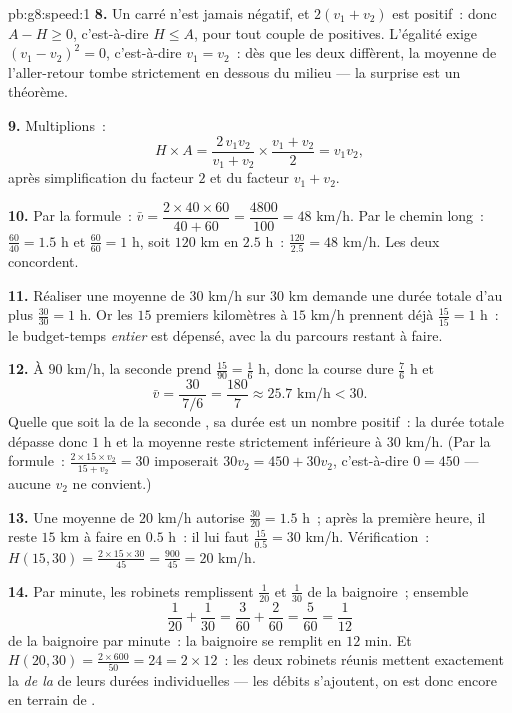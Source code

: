 \begin{solution}{pb:g8:speed:1}
\textbf{8.} Un carré n'est jamais négatif, et $2(v_1 + v_2)$ est
positif~: donc $A - H \geq 0$, c'est-à-dire $H \leq A$, pour tout
couple de  positives. L'égalité exige
$(v_1 - v_2)^2 = 0$, c'est-à-dire $v_1 = v_2$~: dès que les deux
 diffèrent, la moyenne de l'aller-retour tombe strictement
en dessous du milieu --- la surprise est un théorème.

\textbf{9.} Multiplions~:
\[
H \times A
= \frac{2\, v_1 v_2}{v_1 + v_2} \times \frac{v_1 + v_2}{2}
= v_1 v_2 ,
\]
après simplification du facteur $2$ et du facteur $v_1 + v_2$.

\textbf{10.} Par la formule~: $\bar v = \dfrac{2 \times 40 \times
60}{40 + 60} = \dfrac{4800}{100} = 48$ km/h. Par le chemin long~:
$\frac{60}{40} = 1.5$ h et $\frac{60}{60} = 1$ h, soit $120$ km en
$2.5$ h~: $\frac{120}{2.5} = 48$ km/h. Les deux concordent.

\textbf{11.} Réaliser une moyenne de $30$ km/h sur $30$ km demande
une durée totale d'au plus $\frac{30}{30} = 1$ h. Or les $15$
premiers kilomètres à $15$ km/h prennent déjà
$\frac{15}{15} = 1$ h~: le budget-temps \emph{entier} est dépensé,
avec la  du parcours restant à faire.

\textbf{12.} À $90$ km/h, la seconde  prend
$\frac{15}{90} = \frac16$ h, donc la course dure $\frac76$ h et
\[
\bar v = \frac{30}{\ 7/6\ } = \frac{180}{7} \approx 25.7
\text{ km/h} < 30 .
\]
Quelle que soit la  de la seconde , sa durée est un
nombre positif~: la durée totale dépasse donc $1$ h et la moyenne
reste strictement inférieure à $30$ km/h. (Par la formule~:
$\frac{2 \times 15 \times v_2}{15 + v_2} = 30$ imposerait
$30 v_2 = 450 + 30 v_2$, c'est-à-dire $0 = 450$ --- aucune 
$v_2$ ne convient.)

\textbf{13.} Une moyenne de $20$ km/h autorise
$\frac{30}{20} = 1.5$ h~; après la première heure, il reste $15$ km
à faire en $0.5$ h~: il lui faut $\frac{15}{0.5} = 30$ km/h.
Vérification~:
$H(15, 30) = \frac{2 \times 15 \times 30}{45} = \frac{900}{45}
= 20$ km/h.

\textbf{14.} Par minute, les robinets remplissent $\frac{1}{20}$ et
$\frac{1}{30}$ de la baignoire~; ensemble
\[
\frac{1}{20} + \frac{1}{30}
= \frac{3}{60} + \frac{2}{60}
= \frac{5}{60} = \frac{1}{12}
\]
de la baignoire par minute~: la baignoire se remplit en $12$ min.
Et $H(20, 30) = \frac{2 \times 600}{50} = 24 = 2 \times 12$~: les
deux robinets réunis mettent exactement la \emph{ de la
} de leurs durées individuelles --- les débits
s'ajoutent, on est donc encore en terrain de .


\end{solution}
